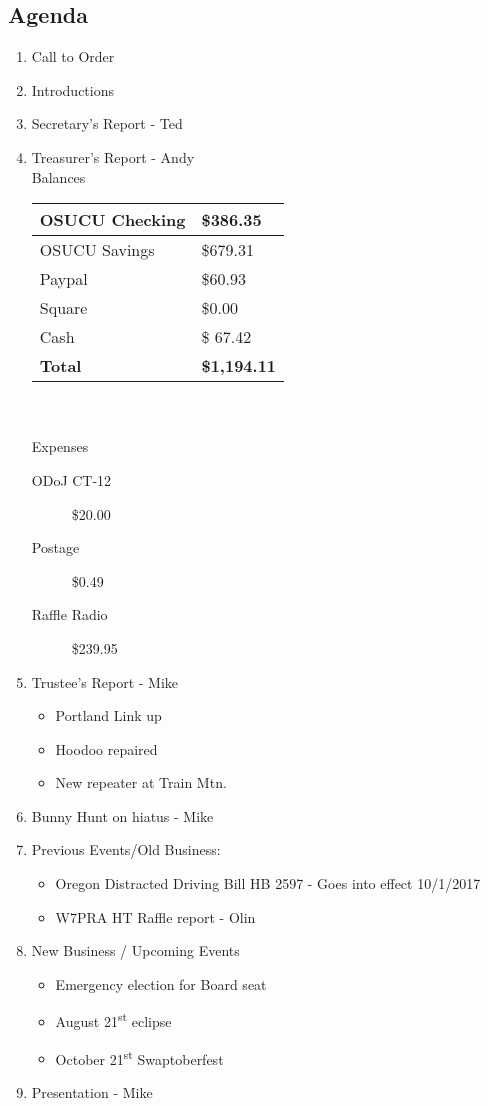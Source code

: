 \documentclass[letter,11pt]{extarticle}
\begin{document}
	\subsection*{Agenda}
	\begin{enumerate}
		\item Call to Order
		\item Introductions
		\item Secretary's Report - Ted
		\item Treasurer's Report - Andy \\
				Balances \\
			\begin{tabular}{|l|l|} \hline
				OSUCU Checking & \$386.35 \\ \hline
				OSUCU Savings & \$679.31 \\ \hline
				Paypal & \$60.93 \\ \hline
				Square & \$0.00 \\ \hline
				Cash & \$ 67.42 \\ \hline
				\textbf{Total} & \textbf{\$1,194.11} \\ \hline
			\end{tabular} \\ \\
			Expenses
			\begin{description}
				\item[ODoJ CT-12] \$20.00
				\item[Postage] \$0.49
				\item[Raffle Radio] \$239.95
			\end{description}
		\item Trustee's Report - Mike
			\begin{itemize}
				\item Portland Link up
				\item Hoodoo repaired
				\item New repeater at Train Mtn. 		
			\end{itemize}
		\item Bunny Hunt on hiatus - Mike
		\item Previous Events/Old Business:
			\begin{itemize}
				\item Oregon Distracted Driving Bill HB 2597 - Goes into effect 10/1/2017
				\item W7PRA HT Raffle report - Olin
				\end{itemize}
		\item  New Business / Upcoming Events
			\begin{itemize}
				\item Emergency election for Board seat
				\item August 21\textsuperscript{st} eclipse
				\item October 21\textsuperscript{st} Swaptoberfest
			\end{itemize}
		\item  Presentation - Mike
	\end{enumerate}
\end{document}
